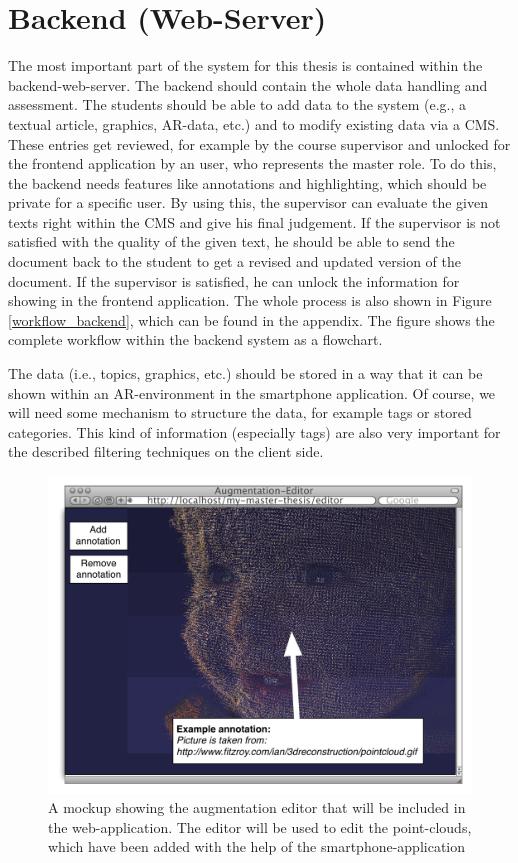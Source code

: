 \section{Backend (Web-Server)}
The most important part of the system for this thesis is contained within the backend-web-server. The backend should contain the whole data handling and assessment. The students should be able to add data to the system (e.g., a textual article, graphics, \ac{AR}-data, etc.) and to modify existing data via a \ac{CMS}. These entries get reviewed, for example by the course supervisor and unlocked for the frontend application by an user, who represents the master role. To do this, the backend needs features like annotations and highlighting, which should be private for a specific user. By using this, the supervisor can evaluate the given texts right within the \ac{CMS} and give his final judgement. If the supervisor is not satisfied with the quality of the given text, he should be able to send the document back to the student to get a revised and updated version of the document. If the supervisor is satisfied, he can unlock the information for showing in the frontend application. The whole process is also shown in Figure \ref{workflow_backend}, which can be found in the appendix. The figure shows the complete workflow within the backend system as a flowchart.

The data (i.e., topics, graphics, etc.) should be stored in a way that it can be shown within an \ac{AR}-environment in the smartphone application. Of course, we will need some mechanism to structure the data, for example tags or stored categories. This kind of information (especially tags) are also very important for the described filtering techniques on the client side.

\begin{figure}[ht]
\centerline{\includegraphics[width=1\textwidth]{gfx/mockup_web_1}}
\caption{A mockup showing the augmentation editor that will be included in the web-application. The editor will be used to edit the point-clouds, which have been added with the help of the smartphone-application}
\label{augmentation_web}
\end{figure}

